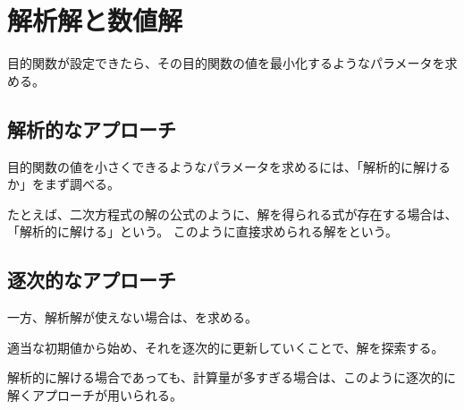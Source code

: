 \documentclass[../../../topic_machine-learning]{subfiles}
\begin{document}
\sectionline
\section{解析解と数値解}

目的関数が設定できたら、その目的関数の値を最小化するようなパラメータを求める。

\subsection{解析的なアプローチ}

目的関数の値を小さくできるようなパラメータを求めるには、「解析的に解けるか」をまず調べる。

たとえば、二次方程式の解の公式のように、解を得られる式が存在する場合は、「解析的に解ける」という。
このように直接求められる解をという。

\subsection{逐次的なアプローチ}

一方、解析解が使えない場合は、を求める。

適当な初期値から始め、それを逐次的に更新していくことで、解を探索する。

\br

解析的に解ける場合であっても、計算量が多すぎる場合は、このように逐次的に解くアプローチが用いられる。
\end{document}
